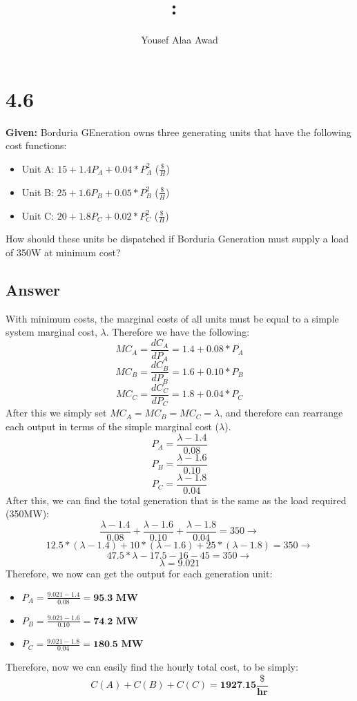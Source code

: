 \documentclass{article}
\title{
    \vspace{2in}
    \textmd{\textbf{\hmwkClass:\ \hmwkTitle}}\\
    \normalsize\vspace{0.1in}
    \vspace{3in}
}
\author{Yousef Alaa Awad}
\begin{document}
\maketitle
\pagebreak

\section{4.6}
\textbf{Given:} Borduria GEneration owns three generating units that have the following cost functions:
\begin{itemize}
	\item Unit A: $15+1.4P_A+0.04*P^2_A$ ($\frac{\$}{H}$) 
	\item Unit B: $25+1.6P_B+0.05*P^2_B$ ($\frac{\$}{H}$) 
	\item Unit C: $20+1.8P_C+0.02*P^2_C$ ($\frac{\$}{H}$) 
\end{itemize}
How should these units be dispatched if Borduria Generation must supply a load of 350W at minimum cost?

\subsection{Answer}
With minimum costs, the marginal costs of all units must be equal to a simple system marginal cost, $\lambda$. Therefore we have the following:
$$ MC_A = \frac{dC_A}{dP_A} = 1.4 + 0.08*P_A $$
$$ MC_B = \frac{dC_B}{dP_B} = 1.6 + 0.10*P_B $$
$$ MC_C = \frac{dC_C}{dP_C} = 1.8 + 0.04*P_C $$
After this we simply set $MC_A = MC_B = MC_C = \lambda$, and therefore can rearrange each output in terms of the simple marginal cost ($\lambda$).
$$ P_A = \frac{\lambda - 1.4}{0.08} $$
$$ P_B = \frac{\lambda - 1.6}{0.10} $$
$$ P_C = \frac{\lambda - 1.8}{0.04} $$
After this, we can find the total generation that is the same as the load required (350MW):
$$ \frac{\lambda - 1.4}{0.08} + \frac{\lambda - 1.6}{0.10} + \frac{\lambda - 1.8}{0.04} = 350 \rightarrow $$
$$ 12.5*(\lambda - 1.4) + 10*(\lambda - 1.6) + 25*(\lambda - 1.8) = 350 \rightarrow $$
$$ 47.5*\lambda - 17.5 - 16 - 45 = 350 \rightarrow $$
$$ \lambda = 9.021 $$
Therefore, we now can get the output for each generation unit:
\begin{itemize}
	\item $P_A = \frac{9.021 - 1.4}{0.08} = \textbf{95.3 MW}$
	\item $P_B = \frac{9.021 - 1.6}{0.10} = \textbf{74.2 MW}$
	\item $P_C = \frac{9.021 - 1.8}{0.04} = \textbf{180.5 MW}$
\end{itemize}
Therefore, now we can easily find the hourly total cost, to be simply: 
$$ C(A) + C(B) + C(C) = \textbf{1927.15}\frac{\textbf{\$}}{\textbf{hr}} $$
\end{document}
